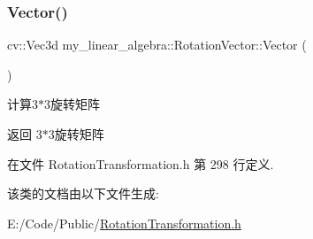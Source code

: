 \subsubsection{\texorpdfstring{Vector()}{Vector()}}
{\footnotesize\ttfamily cv\+::\+Vec3d my\+\_\+linear\+\_\+algebra\+::\+Rotation\+Vector\+::\+Vector (\begin{DoxyParamCaption}{ }\end{DoxyParamCaption})\hspace{0.3cm}{\ttfamily [inline]}}



计算3$\ast$3旋转矩阵 

\begin{DoxyReturn}{返回}
3$\ast$3旋转矩阵 
\end{DoxyReturn}


在文件 Rotation\+Transformation.\+h 第 298 行定义.



该类的文档由以下文件生成\+:\begin{DoxyCompactItemize}
\item 
E\+:/\+Code/\+Public/\mbox{\hyperlink{_rotation_transformation_8h}{Rotation\+Transformation.\+h}}\end{DoxyCompactItemize}
